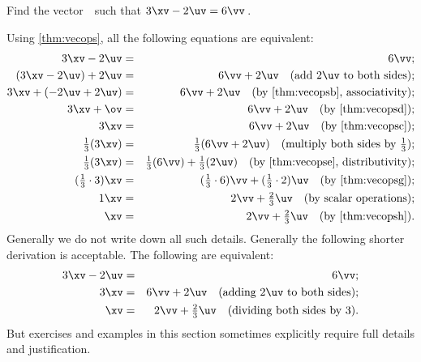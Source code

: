 \begin{example} 
Find the vector~\xv\ such that \(3\xv-2\uv=6\vv\)\,.
\begin{solution} 
Using \cref{thm:vecops}, all the following equations are equivalent:
\begin{eqnarray*}
3\xv-2\uv&=&6\vv
;\\
(3\xv-2\uv)+2\uv&=&6\vv+2\uv
\quad(\text{add \(2\uv\) to both sides});\\
3\xv+(-2\uv+2\uv)&=&6\vv+2\uv
\quad\text{(by \ref{thm:vecopsb}, associativity);}\\
3\xv+\ov&=&6\vv+2\uv
\quad(\text{by \ref{thm:vecopsd}});\\
3\xv&=&6\vv+2\uv
\quad(\text{by \ref{thm:vecopsc}});\\
\tfrac13(3\xv)&=&\tfrac13(6\vv+2\uv)
\quad(\text{multiply both sides by }\tfrac13);\\
\tfrac13(3\xv)&=&\tfrac13(6\vv)+\tfrac13(2\uv)
\quad\text{(by \ref{thm:vecopse}, distributivity);}\\
(\tfrac13\cdot3)\xv&=&(\tfrac13\cdot6)\vv+(\tfrac13\cdot2)\uv
\quad(\text{by \ref{thm:vecopsg}});\\
1\xv&=&2\vv+\tfrac23\uv
\quad(\text{by scalar operations});\\
\xv&=&2\vv+\tfrac23\uv
\quad(\text{by \ref{thm:vecopsh}}).
\end{eqnarray*}
Generally we do not write down all such details.
Generally the following shorter derivation is acceptable.
The following are equivalent:
\begin{eqnarray*}
3\xv-2\uv&=&6\vv
;\\
3\xv&=&6\vv+2\uv
\quad(\text{adding \(2\uv\) to both sides});\\
\xv&=&2\vv+\tfrac23\uv
\quad(\text{dividing both sides by }3).
\end{eqnarray*}
But exercises and examples in this section sometimes explicitly require full details and justification.
\end{solution}
\end{example}




